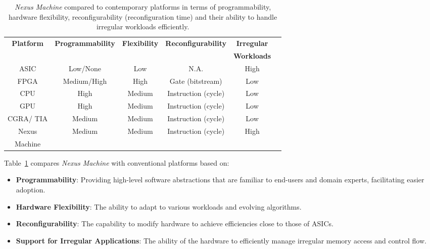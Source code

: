 \begin{table}[]
    \centering
    \resizebox{0.95\columnwidth}{!} {
    \begin{tabular}{|c|c|c|c|c|l}\hline
        \textbf{Platform} & \textbf{Programmability} & \textbf{Flexibility} & \textbf{Reconfigurability}  &\textbf{Irregular} \\
 & & & &\textbf{Workloads}\\ \hline
         ASIC&  Low/None&  Low& N.A. &High\\ \hline
         FPGA&  {Medium/High}&  High& Gate (bitstream) &Low\\ \hline
         CPU&  High&  Medium& Instruction (cycle) &Low\\ \hline
         GPU&  High&  Medium& Instruction (cycle) &Low\\ \hline
         CGRA/ TIA&  {Medium}&  Medium& Instruction (cycle) &Low\\ \hline
         {\cellcolor[HTML]{C9C0BB}}{Nexus}&  {\cellcolor[HTML]{C9C0BB}}{Medium}&  {\cellcolor[HTML]{C9C0BB}}{Medium} & {\cellcolor[HTML]{C9C0BB}}{Instruction (cycle)} &{\cellcolor[HTML]{C9C0BB}}{High}\\
 {\cellcolor[HTML]{C9C0BB}}{Machine}& {\cellcolor[HTML]{C9C0BB}}& {\cellcolor[HTML]{C9C0BB}}&{\cellcolor[HTML]{C9C0BB}} & {\cellcolor[HTML]{C9C0BB}}\\ \hline
    \end{tabular}
    }
    \caption{\textit{Nexus Machine} compared to contemporary platforms in terms of programmability, hardware flexibility, reconfigurability (reconfiguration time) and their ability to handle irregular workloads efficiently.}
    \label{tab:platform_comparison}
\end{table}
Table~\ref{tab:platform_comparison} compares \textit{Nexus Machine} with conventional platforms based on: %
\begin{itemize} 
\item \textbf{Programmability}: Providing high-level software abstractions that are familiar to end-users and domain experts, facilitating easier adoption.
\item \textbf{Hardware Flexibility}: The ability to adapt to various workloads and evolving algorithms.
\item \textbf{Reconfigurability}: The capability to modify hardware to achieve efficiencies close to those of ASICs.
\item \textbf{Support for Irregular Applications}: The ability of the hardware to efficiently manage irregular memory access and control flow.
\end{itemize}
